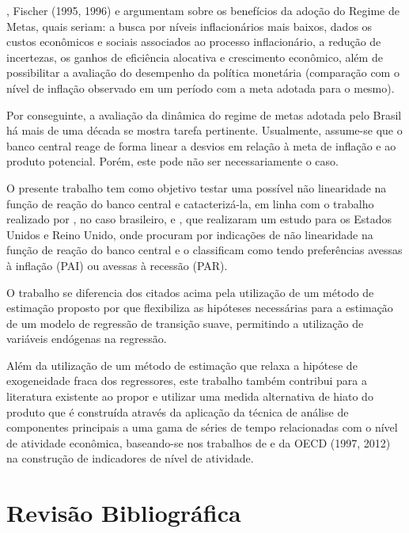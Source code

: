 \documentclass[
	article,			%
	11pt,				%
	oneside,			%
	a4paper,			%
	english,			%
	brazil,				%
	]{abntex2}
\begin{document}
	, Fischer (1995, 1996) e  argumentam sobre os benefícios da adoção do Regime de Metas, quais seriam: a busca por níveis inflacionários mais baixos, dados os custos econômicos e sociais associados ao processo inflacionário, a redução de incertezas, os ganhos de eficiência alocativa e crescimento econômico, além de possibilitar a avaliação do desempenho da política monetária (comparação com o nível de inflação observado em um período com a meta adotada para o mesmo).
	
	Por conseguinte, a avaliação da dinâmica do regime de metas adotada pelo Brasil há mais de uma década se mostra tarefa pertinente. Usualmente, assume-se que o banco central reage de forma linear a desvios em relação à meta de inflação e ao produto potencial.  Porém, este pode não ser necessariamente o caso.
	
	O presente trabalho tem como objetivo testar uma possível não linearidade na função de reação do banco central e catacterizá-la, em linha com o trabalho realizado por , no caso brasileiro, e , que realizaram um estudo para os Estados Unidos e Reino Unido, onde procuram por indicações de não linearidade na função de reação do banco central e o classificam como tendo preferências avessas à inflação (PAI) ou avessas à recessão (PAR).
	
	O trabalho se diferencia dos citados acima pela utilização de um método de estimação proposto por  que flexibiliza as hipóteses necessárias para a estimação de um modelo de regressão de transição suave, permitindo a utilização de variáveis endógenas na regressão. 
	
	Além da utilização de um método de estimação que relaxa a hipótese de exogeneidade fraca dos regressores, este trabalho também contribui para a literatura existente ao propor e utilizar uma medida alternativa de hiato do produto que é construída através da aplicação da técnica de análise de componentes principais a uma gama de séries de tempo relacionadas com o nível de atividade econômica, baseando-se nos trabalhos de  e da OECD (1997, 2012) na construção de indicadores de nível de atividade.
	
	\section{Revisão Bibliográfica}
	
\end{document}
